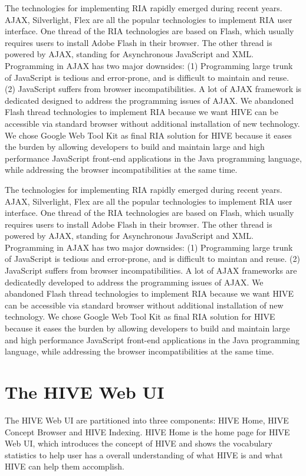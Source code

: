 The technologies for implementing RIA rapidly emerged during recent years. AJAX, Silverlight, Flex are 
all the popular technologies to implement RIA user interface. One thread of the RIA technologies are 
based on Flash, which usually requires users to install Adobe Flash in their browser. The other thread 
is powered by AJAX, standing for Asynchronous JavaScript and XML. Programming in AJAX has two major 
downsides: (1) Programming large trunk of JavaScript is tedious and error-prone, and is difficult to 
maintain and reuse. (2) JavaScript suffers from browser incompatibilities. A lot of AJAX framework is 
dedicated designed to address the programming issues of AJAX. We abandoned Flash thread technologies 
to implement RIA because we want HIVE can be accessible via standard browser without additional 
installation of new technology. We chose Google Web Tool Kit as final RIA solution for HIVE because it 
eases the burden by allowing developers to build and maintain large and high performance JavaScript 
front-end applications in the Java programming language, while addressing the browser incompatibilities 
at the same time.

The technologies for implementing RIA rapidly emerged during recent years. AJAX, Silverlight, Flex are all 
the popular technologies to implement RIA user interface. One thread of the RIA technologies are based on 
Flash, which usually requires users to install Adobe Flash in their browser. The other thread is powered by 
AJAX, standing for Asynchronous JavaScript and XML. Programming in AJAX has two major downsides: (1) Programming 
large trunk of JavaScript is tedious and error-prone, and is difficult to maintan and reuse. (2) JavaScript 
suffers from browser incompatibilities. A lot of AJAX frameworks are dedicatedly developed to address the 
programming issues of AJAX. We abandoned Flash thread technologies to implement RIA because we want HIVE can 
be accessible via standard browser without additional installation of new technology. We chose Google Web Tool 
Kit as final RIA solution for HIVE because it eases the burden by allowing developers to build and maintain 
large and high performance JavaScript front-end applications in the Java programming language, while addressing 
the browser incompatibilities at the same time.

\section{The HIVE Web UI}

The HIVE Web UI are partitioned into three components: HIVE Home, HIVE Concept Browser and HIVE Indexing. 
HIVE Home is the home page for HIVE Web UI, which introduces the concept of HIVE and shows the vocabulary 
statistics to help user has a overall understanding of what HIVE is and what HIVE can help them 
accomplish.

